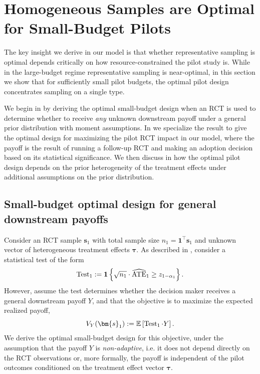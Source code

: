 \section{Homogeneous Samples are Optimal for Small-Budget Pilots}
\label{sec:small-budget}

The key insight we derive in our model is that whether representative sampling is optimal depends critically on how resource-constrained the pilot study is.
While in the large-budget regime representative sampling is near-optimal, in this section we show that for sufficiently small pilot budgets, the optimal pilot design concentrates sampling on a single type.

We begin in  by deriving the optimal small-budget design when an RCT is used to determine whether to receive \emph{any} unknown downstream payoff under a general prior distribution with moment assumptions.
In  we specialize the result to give the optimal design for maximizing the pilot RCT impact in our model, where the payoff is the result of running a follow-up RCT and making an adoption decision based on its statistical significance.
We then discuss in  how the optimal pilot design depends on the prior heterogeneity of the treatment effects under additional assumptions on the prior distribution.

\subsection{Small-budget optimal design for general downstream payoffs}
\label{sec:small-budget-optimal-design}

Consider an RCT sample $\bm{s}_1$ with total sample size $n_1=\bm{1}^\top\bm{s}_1$ and unknown vector of heterogeneous treatment effects $\bm{\tau}$.
As described in , consider a statistical test of the form
\[
  \operatorname{Test}_1 := \mathbf{1}\left\{\sqrt{n_1}\cdot \widehat{\mathrm{ATE}}_1\ge z_{1-\alpha_1}\right\}.
\]
However, assume the test determines whether the decision maker receives a general downstream payoff $Y$, and that the objective is to maximize the expected realized payoff,
\[
  V_Y(\bm{s}_1)
  \defeq
  \E\left[
    \Test_1\cdot Y
  \right].
\]
We derive the optimal small-budget design for this objective, under the assumption that the payoff $Y$ is \emph{non-adaptive}, i.e. it does not depend directly on the RCT observations or, more formally, the payoff is independent of the pilot outcomes conditioned on the treatment effect vector $\bm{\tau}$.

